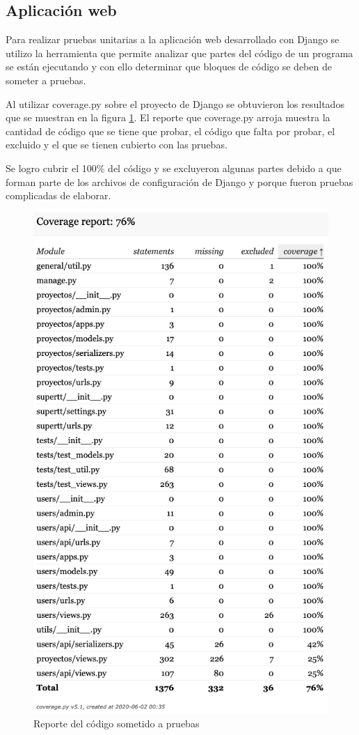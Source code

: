 \subsection{Aplicación web}

Para realizar pruebas unitarias a la aplicación web desarrollado con Django se utilizo la herramienta que permite analizar que partes del código de un programa se están ejecutando y con ello determinar que bloques de código se deben de someter a pruebas.

Al utilizar coverage.py sobre el proyecto de Django se obtuvieron los resultados que se muestran en la figura \ref{fig:coverage}. El reporte que coverage.py arroja muestra la cantidad de código que se tiene que probar, el código que falta por probar, el excluido y el que se tienen cubierto con las pruebas.

Se logro cubrir el 100\% del código y se excluyeron algunas partes debido a que forman parte de los archivos de configuración de Django y porque fueron pruebas complicadas de elaborar.

\begin{figure}[h]
	\centering
	\includegraphics[width=450px]{capitulo6/unitarias/img/coverage.png}
	\caption{Reporte del código sometido a pruebas}
	\label{fig:coverage}
\end{figure}


